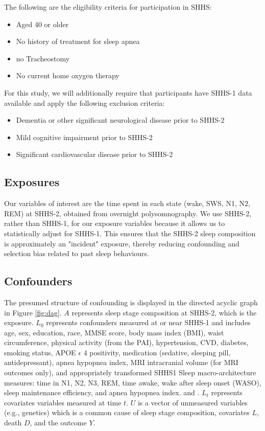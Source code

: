 \documentclass{article}
\begin{document}
The following are the eligibility criteria for participation in SHHS:

\begin{itemize}
    \item Aged 40 or older
    \item No history of treatment for sleep apnea
    \item no Tracheostomy
    \item No current home oxygen therapy
\end{itemize}

\noindent For this study, we will additionally require that participants have SHHS-1 data available and apply the following exclusion criteria:

\begin{itemize}
    \item Dementia or other significant neurological disease prior to SHHS-2
    \item Mild cognitive impairment prior to SHHS-2
    \item Significant cardiovascular disease prior to SHHS-2
\end{itemize}

\subsection{Exposures}

Our variables of interest are the time spent in each state (wake, SWS, N1, N2, REM) at SHHS-2, obtained from overnight polysomnography. We use SHHS-2, rather than SHHS-1, for our exposure variables because it allows us to statistically adjust for SHHS-1. This ensures that the SHHS-2 sleep composition is approximately an "incident" exposure, thereby reducing confounding and selection bias related to past sleep behaviours.

\subsection{Confounders}

The presumed structure of confounding is displayed in the directed acyclic graph in Figure \ref{fig:dag}. $A$ represents sleep stage composition at SHHS-2, which is the exposure. $L_0$ represents confounders measured at or near SHHS-1 and includes age, sex, education, race, MMSE score, body mass index (BMI), waist circumference, physical activity (from the PAI), hypertension, CVD, diabetes, smoking status, APOE $\epsilon$ 4 positivity, medication (sedative, sleeping pill, antidepressant), apnea hypopnea index, MRI intracranial volume (for MRI outcomes only), and appropriately transformed SHHS1 Sleep macro-architecture measures: time in N1, N2, N3, REM, time awake, wake after sleep onset (WASO), sleep maintenance efficiency, and apnea hypopnea index. and . $L_t$ represents covariates variables measured at time $t$. $U$ is a vector of unmeasured variables (e.g., genetics) which is a common cause of sleep stage composition, covariates $L$, death $D$, and the outcome $Y$.
\end{document}
